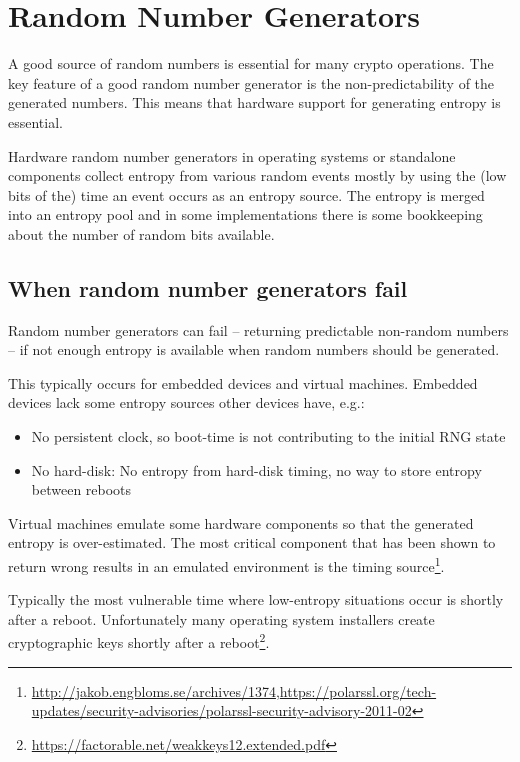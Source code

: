 \section{Random Number Generators}
\label{section:RNGs}


A good source of random numbers is essential for many crypto
operations. The key feature of a good random number generator is the
non-predictability of the generated numbers. This means that hardware
support for generating entropy is essential.


Hardware random number generators in operating systems or standalone
components collect entropy from various random events mostly by using
the (low bits of the) time an event occurs as an entropy source. The
entropy is merged into an entropy pool and in some implementations there
is some bookkeeping about the number of random bits available.

\subsection{When random number generators fail}

Random number generators can fail -- returning predictable non-random
numbers -- if not enough entropy is available when random numbers should
be generated.

This typically occurs for embedded devices and virtual machines.
Embedded devices lack some entropy sources other devices have, e.g.:

\begin{itemize}
\item No persistent clock, so boot-time is not contributing to the
    initial RNG state
\item No hard-disk: No entropy from hard-disk timing, no way to store
    entropy between reboots
\end{itemize}

Virtual machines emulate some hardware components so that the
generated entropy is over-estimated. The most critical component that
has been shown to return wrong results in an emulated environment is the
timing
source\footnote{\url{http://jakob.engbloms.se/archives/1374},\url{https://polarssl.org/tech-updates/security-advisories/polarssl-security-advisory-2011-02}}.

Typically the most vulnerable time where low-entropy situations occur is
shortly after a reboot. Unfortunately many operating system installers
create cryptographic keys shortly after a
reboot\footnote{\url{https://factorable.net/weakkeys12.extended.pdf}}.

